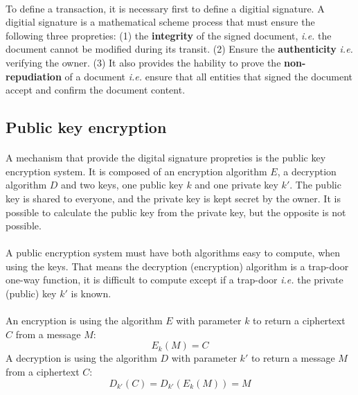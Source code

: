 \documentclass[letterpaper]{article}
\begin{document}
\paragraph{}
To define a transaction, it is necessary first to define a digitial signature.
A digitial signature is a mathematical scheme process that must ensure
the following three propreties: (1) the \textbf{integrity} of the signed document,
\textit{i.e.} the document cannot be modified during its transit. (2) Ensure
the \textbf{authenticity} \textit{i.e.} verifying the owner.
(3) It also provides the hability to prove the \textbf{non-repudiation}
of a document \textit{i.e.} ensure that all entities that signed the
document accept and confirm the document content.

\subsection{Public key encryption}

\paragraph{}
A mechanism that provide the digital signature propreties is the public key
encryption system\cite{RSA}. It is composed of an encryption algorithm $E$, a
decryption algorithm $D$ and two keys, one public key $k$ and one private key
$k'$. The public key is shared to everyone, and the private key is
kept secret by the owner. It is possible to calculate the public key
from the private key, but the opposite is not possible.

\paragraph{}
A public encryption system must have both algorithms
easy to compute, when using the keys. That means the decryption (encryption)
algorithm is a trap-door one-way function\cite{DiffieHellman}, it
is difficult to compute except if a trap-door \textit{i.e.}
the private (public) key $k'$ is known.
\paragraph{}

An encryption is using the algorithm $E$ with parameter $k$
to return a ciphertext $C$ from a message $M$:
\begin{equation}
    E_k(M) = C
\end{equation}
A decryption is using the algorithm $D$ with parameter $k'$
to return a message $M$ from a ciphertext $C$:
\begin{equation}
    D_{k'}(C) = D_{k'}(E_k(M)) =  M
\end{equation}
\end{document}
